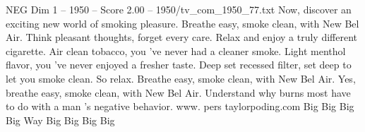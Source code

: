 \begin{textsample}{NEG Dim 1 – 1950 – Score 2.00 – 1950/tv\_com\_1950\_77.txt}  \label{ex:f1_neg_087}
Now, discover an exciting new world of smoking pleasure.
Breathe easy, smoke clean, with New Bel Air.
Think pleasant thoughts, forget every care.
Relax and enjoy a truly different cigarette.
Air clean tobacco, you 've never had a cleaner smoke.
Light menthol flavor, you 've never enjoyed a fresher taste.
Deep set recessed filter, set deep to let you smoke clean.
So relax.
Breathe easy, smoke clean, with New Bel Air.
Yes, breathe easy, smoke clean, with New Bel Air.
Understand why burns most have to do with a man 's negative behavior. www. pers taylorpoding.com Big Big Big Big Way Big Big Big Big

\end{textsample}
